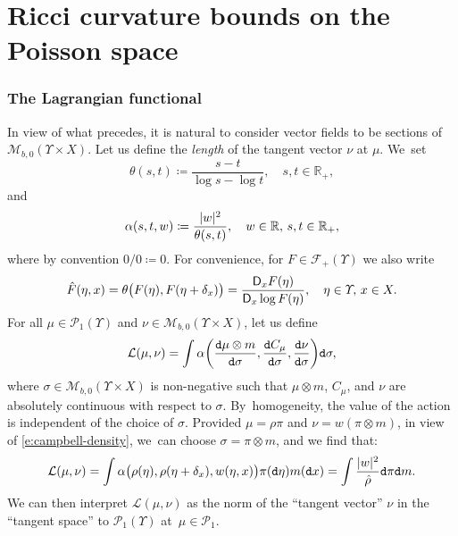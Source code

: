 \documentclass[10pt]{amsart}
\newcommand{\real}{\mathbb{R}}
\theoremstyle{definition}
\theoremstyle{remark}
\DeclarePairedDelimiter{\paren}{\lparen}{\rparen}
\DeclarePairedDelimiter{\abs}{\lvert}{\rvert}
\begin{document}
\section{Ricci curvature bounds on the Poisson space}

\label{s:variational-distance}
\subsubsection{The Lagrangian functional}
In view of what precedes, it is natural to consider vector fields to be sections of $\mathscr{M}_{b,0}(\varUpsilon \times X)$.
Let us define the \emph{length} of the tangent vector $\nu$ at $\mu$. We~set
\begin{equation*}
\theta(s,t) \coloneq \frac{s-t}{\log s - \log t}, \quad s,t \in \real_{+},
\end{equation*}
and
\begin{equation*}
\alpha(s,t,w) \coloneq \frac{\abs{w}^{2}}{\theta(s,t)}, \quad w \in \real,\, s,t \in \real_{+},
\end{equation*}
where by convention $0/0 \coloneq 0$.
For convenience, for $F \in \mathscr{F}_{+}(\varUpsilon)$ we also write
\begin{equation*}
\hat{F}(\eta, x) = \theta\paren[\big]{F(\eta), F(\eta + \delta_{x})} = \frac{\mathsf{D}_{x} F(\eta)}{\mathsf{D}_{x} \log F(\eta)}, \quad \eta \in \varUpsilon,\, x \in X.
\end{equation*}
For all $\mu \in \mathscr{P}_{1}(\varUpsilon)$ and $\nu \in \mathscr{M}_{b,0}(\varUpsilon \times X)$, let us define
\begin{equation*}
\mathcal{L}(\mu, \nu) = \int \alpha\paren*{\frac{\mathtt{d} \mu \otimes m}{\mathtt{d} \sigma}, \frac{\mathtt{d} C_{\mu}}{\mathtt{d} \sigma}, \frac{\mathtt{d} \nu}{\mathtt{d} \sigma}} \mathtt{d} \sigma,
\end{equation*}
where $\sigma \in \mathscr{M}_{b,0}(\varUpsilon \times X)$ is non-negative such that $\mu \otimes m$, $C_{\mu}$, and $\nu$ are absolutely continuous with respect to $\sigma$.
By~homogeneity, the value of the action is independent of the choice of $\sigma$.
Provided $\mu = \rho \pi$ and $\nu = w (\pi \otimes m)$, in view of \cref{e:campbell-density}, we~can choose $\sigma = \pi \otimes m$, and we find that:
\begin{equation*}
\mathcal{L}(\mu, \nu) = \int \alpha\big(\rho(\eta), \rho(\eta + \delta_{x}),w(\eta, x)\big) \pi(\mathtt{d} \eta) m(\mathtt{d} x) = \int \frac{\abs{w}^{2}}{\hat{\rho}} \mathtt{d} \pi \mathtt{d} m.
\end{equation*}
We can then interpret $\mathcal{L}(\mu, \nu)$ as the norm of the \enquote{tangent vector} $\nu$ in the \enquote{tangent space} to $\mathscr{P}_1(\varUpsilon)$ at~$\mu\in\mathscr{P}_1$.
\end{document}
